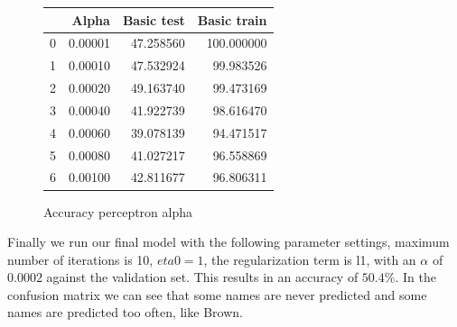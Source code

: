 \documentclass[11pt]{article}
\begin{document}
\begin{figure}
\begin{tabular}{lrrr}
\toprule
{} &  Alpha &  Basic test &  Basic train \\
\midrule
0 &   0.00001 &   47.258560 &   100.000000 \\
1 &   0.00010 &   47.532924 &    99.983526 \\
2 &   0.00020 &   49.163740 &    99.473169 \\
3 &   0.00040 &   41.922739 &    98.616470 \\
4 &   0.00060 &   39.078139 &    94.471517 \\
5 &   0.00080 &   41.027217 &    96.558869 \\
6 &   0.00100 &   42.811677 &    96.806311 \\
\bottomrule
\end{tabular} 
\caption{Accuracy perceptron alpha}
\label{Accuracy testing for alphas}
\end{figure}
%
Finally we run our final model with the following parameter settings, maximum number of iterations is 10, $eta0=1$, the regularization term is l1, with an $\alpha$ of $0.0002$ against the validation set. This results in an accuracy of $50.4\%$. In the confusion matrix we can see that some names are never predicted and some names are predicted too often, like Brown. 
%
%
\end{document}
